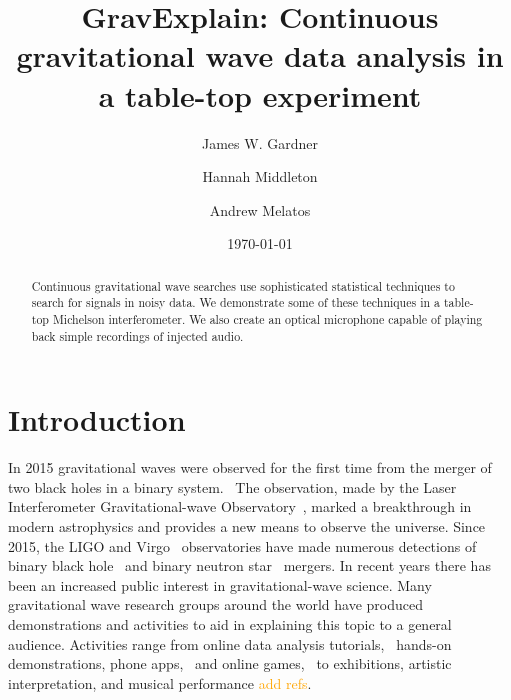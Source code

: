 \documentclass[prb,preprint]{revtex4-1}
\newcommand{\han}{\textcolor{orange}}
\begin{document}
\title{GravExplain: Continuous gravitational wave data analysis in a table-top experiment}

\author{James W. Gardner}

\author{Hannah Middleton}
\author{Andrew Melatos}

\date{\today}

\begin{abstract}
Continuous gravitational wave searches use sophisticated statistical techniques to search for signals in noisy data. We demonstrate some of these techniques in a table-top Michelson interferometer. We also create an optical microphone capable of playing back simple recordings of injected audio.
 
\end{abstract}

\maketitle


\section{Introduction}

In 2015 gravitational waves were observed for the first time from the merger of two black holes in a binary system.~\cite{GW150914} 
The observation, made by the Laser Interferometer Gravitational-wave Observatory~\citep[LIGO]{AdvancedLIGO:2015}, marked a breakthrough in modern astrophysics and provides a new means to observe the universe. 
Since 2015, the LIGO and Virgo~\cite{AdvancedVirgo:2015} observatories have made numerous detections of binary black hole~\cite{GW151226,GW170104,GW170814} and binary neutron star~\cite{GW170817,GW170817multi,GW190425} mergers. 
In recent years there has been an increased public interest in gravitational-wave science. 
Many gravitational wave research groups around the world have produced demonstrations and activities to aid in explaining this topic to a general audience.
Activities range from online data analysis tutorials,~\cite{GWOSC:online,LOSC:2015} hands-on demonstrations, phone apps,~\cite{LaserLabs:online,SciVR:online} and online games,~\cite{BlackHoleHunter:online} to exhibitions,\cite{L2URSSE} artistic interpretation, and musical performance \han{add refs}. 
\end{document}
